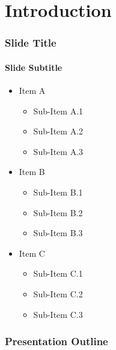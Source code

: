 \section{Introduction}
\label{sec:introduction}

\begin{frame}[t]
\frametitle{Slide Title}
\framesubtitle{Slide Subtitle}
		\begin{itemize}
		\setlength\itemsep{0.8em}
			\item Item A
			\begin{itemize}
				\item Sub-Item A.1
				\item Sub-Item A.2
				\item Sub-Item A.3
			\end{itemize}

			\item Item B
			\begin{itemize}
				\item Sub-Item B.1
				\item Sub-Item B.2
				\item Sub-Item B.3
			\end{itemize}

			\item Item C
			\begin{itemize}
				\item Sub-Item C.1
				\item Sub-Item C.2
				\item Sub-Item C.3
			\end{itemize}
		\end{itemize}
\end{frame}


\begin{frame}
	\frametitle{Presentation Outline}
	\framesubtitle{\vspace{0em}}
	\tableofcontents
\end{frame}

